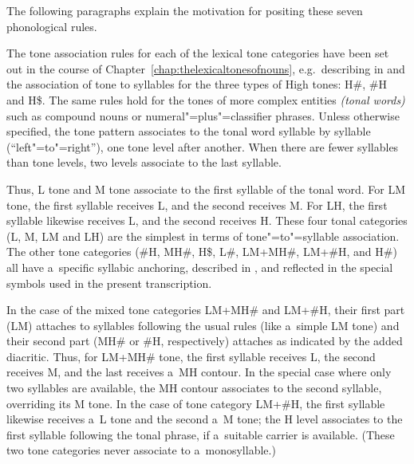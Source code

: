 The following paragraphs explain the motivation for positing these seven {\linebreak}phonological rules.

The tone association rules for each of the lexical tone categories have been set out in the course of Chapter~\ref{chap:thelexicaltonesofnouns}, e.g.~describing in  and  the association of tone to syllables for the three types of High tones:
H\#, \#H and H\$. The same rules hold for the tones of more complex entities \textit{(tonal words)} such as compound
nouns or numeral"=plus"=classifier phrases. Unless otherwise specified, the tone pattern associates to the tonal word syllable by syllable
(“left"=to"=right”), one tone level after another. When there are fewer syllables than tone levels,
two levels associate to the last syllable.

Thus, L tone and M tone associate to the first syllable of the tonal word. For LM tone, the first
syllable receives L, and the second receives M. For LH, the first syllable likewise receives L, and
the second receives H. These four tonal categories (L, M, LM and LH) are the simplest in terms of
tone"=to"=syllable association. The other tone categories (\#H, MH\#, H\$, L\#, LM+MH\#, LM+\#H, and
H\#) all have a~specific syllabic anchoring, described in , and reflected in the special symbols used in the present
transcription. 

In the case of the mixed tone categories LM+MH\# and LM+\#H, their first part (LM) attaches to
syllables following the usual rules (like a~simple LM tone) and their second part (MH\#
or \#H, respectively) attaches as indicated by the added diacritic. Thus, for LM+MH\# tone, the
first syllable receives L, the second receives M, and the last receives a~MH contour. In the special
case where only two syllables are available, the MH contour associates to the second syllable,
overriding its M tone. In the case of tone category LM+\#H, the first syllable likewise receives a~L
tone and the second a~M tone; the H level associates to the first syllable following the tonal
phrase, if a~suitable carrier is available. (These two tone categories never associate to
a~monosyllable.)

